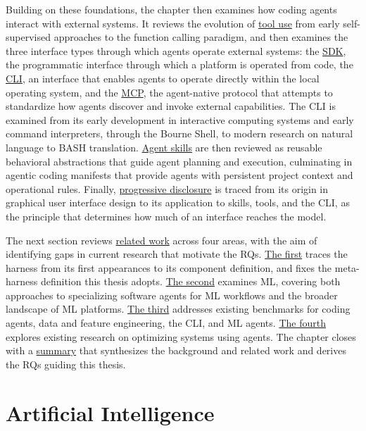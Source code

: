 \documentclass[
english,                 %
bibtex,                  %
]{kththesis}
\numberwithin{listing}{chapter}
\begin{document}
Building on these foundations, the chapter then examines how coding agents interact with external systems. It reviews the evolution of \hyperref[sec:bg_tools]{tool use} from early self-supervised approaches to the function calling paradigm, and then examines the three interface types through which agents operate external systems: the \hyperref[sec:bg_software_development_kit]{\gls{SDK}}, the programmatic interface through which a platform is operated from code, the \hyperref[sec:bg_command_line_interface]{\gls{CLI}}, an interface that enables agents to operate directly within the local operating system, and the \hyperref[sec:bg_model_context_protocol]{\gls{MCP}}, the agent-native protocol that attempts to standardize how agents discover and invoke external capabilities. The \gls{CLI} is examined from its early development in interactive computing systems and early command interpreters, through the Bourne Shell, to modern research on natural language to \gls{BASH} translation. \hyperref[sec:bg_agent_skills]{Agent skills} are then reviewed as reusable behavioral abstractions that guide agent planning and execution, culminating in agentic coding manifests that provide agents with persistent project context and operational rules. Finally, \hyperref[sec:bg_progressive_disclosure]{progressive disclosure} is traced from its origin in graphical user interface design to its application to skills, tools, and the \gls{CLI}, as the principle that determines how much of an interface reaches the model.

The next section reviews \hyperref[sec:bg_related_work]{related work} across four areas, with the aim of identifying gaps in current research that motivate the \glspl{RQ}. \hyperref[sec:bg_meta_harnesses]{The first} traces the harness from its first appearances to its component definition, and fixes the meta-harness definition this thesis adopts. \hyperref[sec:bg_machine_learning]{The second} examines \gls{ML}, covering both approaches to specializing software agents for \gls{ML} workflows and the broader landscape of \gls{ML} platforms. \hyperref[sec:bg_benchmarks]{The third} addresses existing benchmarks for coding agents, data and feature engineering, the \gls{CLI}, and \gls{ML} agents. \hyperref[sec:bg_systems_optimization_using_agents]{The fourth} explores existing research on optimizing systems using agents. The chapter closes with a \hyperref[sec:bg_summary]{summary} that synthesizes the background and related work and derives the \glspl{RQ} guiding this thesis.

\section{Artificial Intelligence}
\label{sec:bg_ai}
\glsresetall
\end{document}
